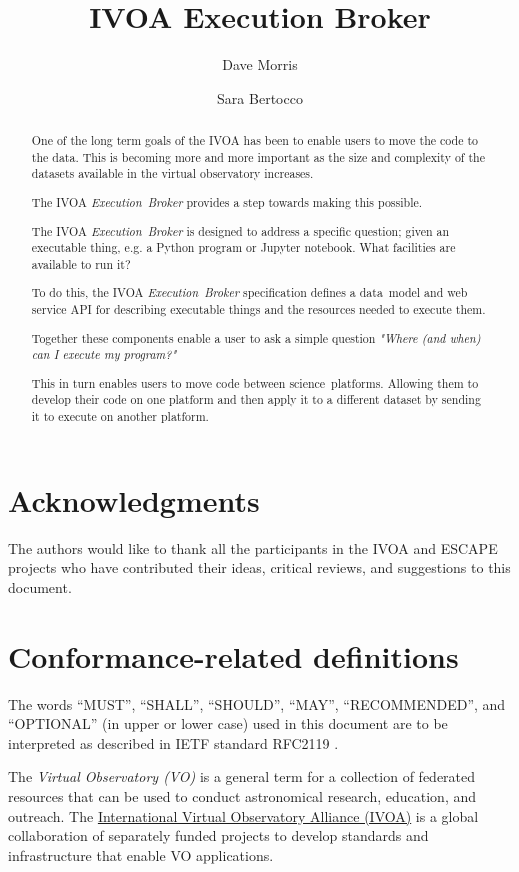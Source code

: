 \documentclass[11pt,a4paper]{ivoa}
\title{IVOA Execution Broker}
\author[http://www.ivoa.net/twiki/bin/view/IVOA/DaveMorris]
       {Dave Morris}
\author[http://www.ivoa.net/twiki/bin/view/IVOA/SaraBertocco]
       {Sara Bertocco}
\newcommand{\datamodel} {data~model}
\newcommand{\webservice} {web service}
\newcommand{\ivoa} {IVOA}
\newcommand{\executionbroker} {\textit{Execution~Broker}}
\newcommand{\jupyternotebook} {Jupyter notebook}
\newcommand{\pythonprogram} {Python program}
\newcommand{\footurl}[1] {\footnote{\url{#1}}}
\newcommand{\dataset}[1] {dataset#1}
\newcommand{\scienceplatform}[1] {science~platform#1}
\begin{document}
\begin{abstract}
\label{abstract}

One of the long term goals of the \ivoa{} has been to enable users to
move the code to the data.
This is becoming more and more important as the size and complexity
of the \dataset{s} available in the virtual observatory increases.

The \ivoa{} \executionbroker{} provides a step towards making this possible.

The \ivoa{} \executionbroker{} is designed to address a specific question;
given an executable thing, e.g. a \pythonprogram{} or \jupyternotebook{}.
What facilities are available to run it?

To do this, the \ivoa{} \executionbroker{} specification defines
a \datamodel{} and \webservice{} API for describing executable things
and the resources needed to execute them.

Together these components enable a user to ask a simple question
\textit{"Where (and when) can I execute my program?"}

This in turn enables users to move code between \scienceplatform{s}.
Allowing them to develop their code on one platform and then apply it to a different
\dataset{} by sending it to execute on another platform.

\end{abstract}

\section*{Acknowledgments}
\label{sect-acknowledgments}

The authors would like to thank all the participants in the IVOA and ESCAPE projects
who have contributed their ideas, critical reviews, and suggestions to this document.

\section*{Conformance-related definitions}
\label{sect-conformance}

The words ``MUST'', ``SHALL'', ``SHOULD'', ``MAY'', ``RECOMMENDED'', and
``OPTIONAL'' (in upper or lower case) used in this document are to be
interpreted as described in IETF standard RFC2119 \citep{std:RFC2119}.

The \emph{Virtual Observatory (VO)} is a general term for a collection of
federated resources that can be used to conduct astronomical research,
education, and outreach.
The \href{https://www.ivoa.net}{International Virtual Observatory Alliance (IVOA)}
is a global collaboration of separately funded projects to develop standards and
infrastructure that enable VO applications.
\end{document}

